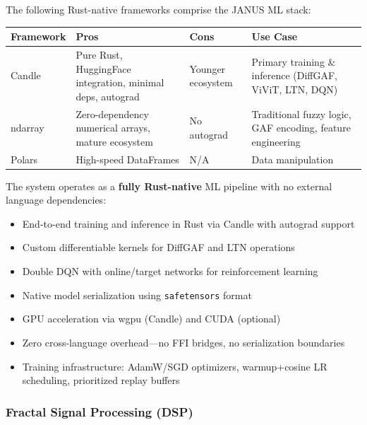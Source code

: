 \documentclass[12pt, a4paper]{article}
\begin{document}
The following Rust-native frameworks comprise the JANUS ML stack:

\begin{table}[htbp]
	\centering
	\begin{tabularx}{\textwidth}{|l|L|L|L|}
		\hline
		\textbf{Framework}        & \textbf{Pros}                                              & \textbf{Cons}     & \textbf{Use Case}                                          \\
		\hline
		Candle \citep{candle2024} & Pure Rust, HuggingFace integration, minimal deps, autograd & Younger ecosystem & Primary training \& inference (DiffGAF, ViViT, LTN, DQN)   \\
		\hline
		ndarray                   & Zero-dependency numerical arrays, mature ecosystem         & No autograd       & Traditional fuzzy logic, GAF encoding, feature engineering \\
		\hline
		Polars \citep{polars2024} & High-speed DataFrames                                      & N/A               & Data manipulation                                          \\
		\hline
	\end{tabularx}
\end{table}

The system operates as a \textbf{fully Rust-native} ML pipeline with no external language dependencies:

\begin{itemize}
	\item End-to-end training and inference in Rust via Candle with autograd support
	\item Custom differentiable kernels for DiffGAF and LTN operations
	\item Double DQN with online/target networks for reinforcement learning
	\item Native model serialization using \texttt{safetensors} format
	\item GPU acceleration via wgpu (Candle) and CUDA (optional)
	\item Zero cross-language overhead---no FFI bridges, no serialization boundaries
	\item Training infrastructure: AdamW/SGD optimizers, warmup+cosine LR scheduling, prioritized replay buffers
\end{itemize}

\subsubsection*{Fractal Signal Processing (DSP)}
\end{document}
